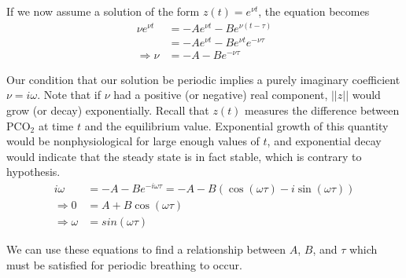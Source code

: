 If we now assume a solution of the form $z(t) = e^{\nu t}$, the equation becomes
\begin{align*}
  \nu e^{\nu t} &= -A e^{\nu t} - B e^{\nu (t-\tau)}\\
  &= -A e^{\nu t} - B e^{\nu t}e^{-\nu \tau}\\
  \Rightarrow \nu &= -A -B e^{-\nu\tau}
\end{align*}

Our condition that our solution be periodic implies a purely imaginary coefficient $\nu = i\omega$. Note that if $\nu$ had a positive (or negative) real component, $||z||$ would grow (or decay) exponentially. Recall that $z(t)$ measures the difference between $\mathrm{PCO}_2$ at time $t$ and the equilibrium value. Exponential growth of this quantity would be nonphysiological for large enough values of $t$, and exponential decay would indicate that the steady state is in fact stable, which is contrary to hypothesis.
\begin{align*}
  i\omega &= -A -B e^{-i\omega \tau} = -A - B \left(\cos(\omega\tau)-i\sin(\omega\tau)\right)\\
  \Rightarrow 0 &= A + B\cos(\omega\tau)\\
  \Rightarrow \omega &= sin(\omega\tau)
\end{align*}

We can use these equations to find a relationship between $A$, $B$, and $\tau$ which must be satisfied for periodic breathing to occur.
